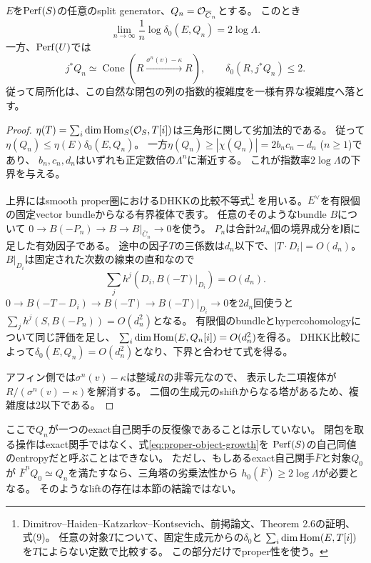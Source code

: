 \begin{theorem}[局所化前後で異なる対象の成長率]
\label{thm:proper-versus-affine-complexity}
$E$を$\operatorname{Perf}(S)$の任意のsplit generator、$Q_n=\mathcal O_{\overline C_n}$とする。
このとき
\begin{equation}\label{eq:proper-object-growth}
 \lim_{n\to\infty}\frac1n\log\delta_0(E,Q_n)=2\log\Lambda.
\end{equation}
一方、$\operatorname{Perf}(U)$では
\[
 j^*Q_n\simeq\operatorname{Cone}
   (R\xrightarrow{\sigma^n(v)-\kappa}R),\qquad
 \delta_0(R,j^*Q_n)\le2.
\]
従って局所化は、この自然な閉包の列の指数的複雑度を一様有界な複雑度へ落とす。
\end{theorem}
\begin{proof}
$\eta(T)=\sum_i\dim\operatorname{Hom}_S(\mathcal O_S,T[i])$は三角形に関して劣加法的である。
従って$\eta(Q_n)\le\eta(E)\delta_0(E,Q_n)$。
一方$\eta(Q_n)\ge|\chi(Q_n)|=2b_nc_n-d_n$ ($n\ge1$)であり、
$b_n,c_n,d_n$はいずれも正定数倍の$\Lambda^n$に漸近する。
これが指数率$2\log\Lambda$の下界を与える。

上界にはsmooth proper圏におけるDHKKの比較不等式\footnote{
Dimitrov--Haiden--Katzarkov--Kontsevich、前掲論文、Theorem 2.6の証明、式(9)。
任意の対象$T$について、固定生成元からの$\delta_0$と
$\sum_i\dim\operatorname{Hom}(E,T[i])$を$T$によらない定数で比較する。
この部分だけでproper性を使う。}
を用いる。$E^\vee$を有限個の固定vector bundleからなる有界複体で表す。
任意のそのようなbundle $B$について
$0\to B(-P_n)\to B\to B|_{\overline C_n}\to0$を使う。
$P_n$は合計$2d_n$個の境界成分を順に足した有効因子である。
途中の因子$T$の三係数は$d_n$以下で、$|T\cdot D_i|=O(d_n)$。
$B|_{D_i}$は固定された次数の線束の直和なので
\[
 \sum_j h^j(D_i,B(-T)|_{D_i})=O(d_n).
\]
$0\to B(-T-D_i)\to B(-T)\to B(-T)|_{D_i}\to0$を$2d_n$回使うと
$\sum_jh^j(S,B(-P_n))=O(d_n^2)$となる。
有限個のbundleとhypercohomologyについて同じ評価を足し、
$\sum_i\dim\operatorname{Hom}(E,Q_n[i])=O(d_n^2)$を得る。
DHKK比較によって$\delta_0(E,Q_n)=O(d_n^2)$となり、下界と合わせて式を得る。

アフィン側では$\sigma^n(v)-\kappa$は整域$R$の非零元なので、
表示した二項複体が$R/(\sigma^n(v)-\kappa)$を解消する。
二個の生成元のshiftからなる塔があるため、複雑度は2以下である。
\end{proof}

ここで$Q_n$が一つのexact自己関手の反復像であることは示していない。
閉包を取る操作はexact関手ではなく、式\eqref{eq:proper-object-growth}を
$\operatorname{Perf}(S)$の自己同値のentropyだと呼ぶことはできない。
ただし、もしあるexact自己関手$\overline F$と対象$Q_0$が
$\overline F^nQ_0\simeq Q_n$を満たすなら、三角塔の劣乗法性から
$h_0(\overline F)\ge2\log\Lambda$が必要となる。
そのようなliftの存在は本節の結論ではない。

